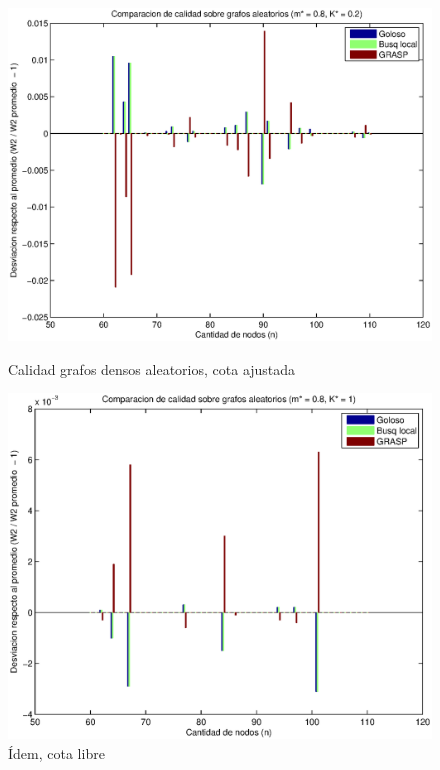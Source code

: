 \begin{figure}[H]
    \begin{minipage}{0.5\linewidth}
      \includegraphics[width=\linewidth]{graficos/todos_calidad_m08_K02.eps}
      \caption{Calidad grafos densos aleatorios, cota ajustada}\label{fig:densos-ajustada}
    \end{minipage}
    \hfill
    \begin{minipage}{0.5\linewidth}
      \includegraphics[width=\linewidth]{graficos/todos_calidad_m08_K1.eps}
      \caption{Ídem, cota libre}\label{fig:densos-libre}
    \end{minipage}    
\end{figure}

